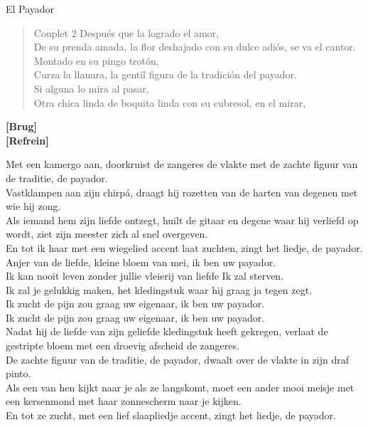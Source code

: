 \begin{song}{El Payador}
\begin{verse}{Couplet 2}
\chord{}Después que la logrado el amor,\\
De su prenda amada, la flor deshajado con su dulce adiós, se va el cantor.\\
\chord{}Montado en su pingo trotón,\\
Curza la llanura, la gentil figura de la tradición del payador.\\

\chord{}Si alguna lo mira al pasar,\\
Otra chica linda de boquita linda con su cubresol, en el mirar,\\
\end{verse}

\textbf{[Brug]}\\
\textbf{[Refrein]}\\

\end{song}
\begin{translation}
Met een kamergo aan, doorkruist de zangeres de vlakte met de zachte figuur van de traditie, de payador.\\
Vastklampen aan zijn chirpá, draagt hij rozetten van de harten van degenen met wie hij zong.\\

Als iemand hem zijn liefde ontzegt, huilt de gitaar en degene waar hij verliefd op wordt, ziet zijn meester zich al snel overgeven. \\
En tot ik haar met een wiegelied accent laat zuchten, zingt het liedje, de payador.\\

Anjer van de liefde, kleine bloem van mei, ik ben uw payador.\\
Ik kan nooit leven zonder jullie vleierij van liefde Ik zal sterven.\\
Ik zal je gelukkig maken, het kledingstuk waar hij graag ja tegen zegt.\\
Ik zucht de pijn zou graag uw eigenaar, ik ben uw payador. \\      
Ik zucht de pijn zou graag uw eigenaar, ik ben uw payador. \\    

Nadat hij de liefde van zijn geliefde kledingstuk heeft gekregen, verlaat de gestripte bloem met een droevig afscheid de zangeres.\\
De zachte figuur van de traditie, de payador, dwaalt over de vlakte in zijn draf pinto.\\


Als een van hen kijkt naar je als ze langskomt, moet een ander mooi meisje met een kersenmond met haar zonnescherm naar je kijken. \\
En tot ze zucht, met een lief slaapliedje accent, zingt het liedje, de payador.\\


\end{translation}